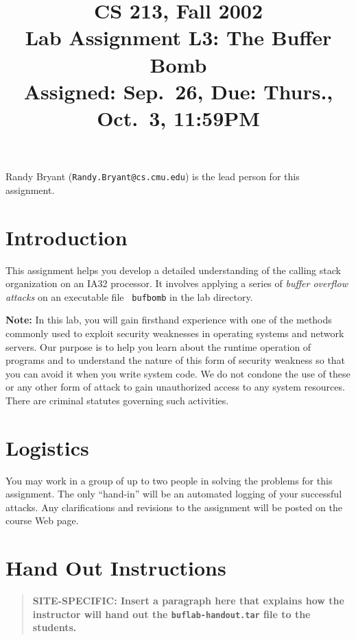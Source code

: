 \documentclass[11pt]{article}
\begin{document}
\title{CS 213, Fall 2002\\
Lab Assignment L3: The Buffer Bomb\\
Assigned: Sep.~26, Due: Thurs., Oct.~3, 11:59PM
}

\author{}
\date{}

\maketitle

Randy Bryant ({\tt Randy.Bryant@cs.cmu.edu}) is the lead person for
this assignment.

\section*{Introduction}

This assignment helps you develop a detailed understanding of the
calling stack organization on an IA32 processor.  It involves applying
a series of {\em buffer overflow attacks} on an executable file {\tt
bufbomb} in the lab directory.

{\bf Note:} In this lab, you will gain firsthand experience with one
of the methods commonly used to exploit security weaknesses in
operating systems and network servers.  Our purpose is to help you
learn about the runtime operation of programs and to understand the
nature of this form of security weakness so that you can avoid it
when you write system code.  We do not condone the use of these or any other
form of attack to gain unauthorized access to any system resources.
There are criminal statutes governing such activities.

\section*{Logistics}

You may work in a group of up to two people in solving the problems
for this assignment.  The only ``hand-in'' will be an automated
logging of your successful attacks.  Any clarifications and revisions
to the assignment will be posted on the course Web page.

\section*{Hand Out Instructions}

\begin{quote}
\bf SITE-SPECIFIC: Insert a paragraph here that explains how the instructor
will hand out the \texttt{buflab-handout.tar} file to the students. 
\end{quote}
\end{document}
